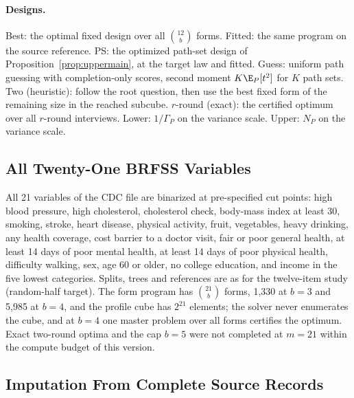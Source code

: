 \paragraph{Designs.}
Best: the optimal fixed design over all $\binom{12}b$ forms. Fitted: the same program on the source reference. PS: the optimized path-set design of Proposition~\ref{prop:uppermain}, at the target law and fitted. Guess: uniform path guessing with completion-only scores, second moment $K\E_P[t^2]$ for $K$ path sets. Two (heuristic): follow the root question, then use the best fixed form of the remaining size in the reached subcube. $r$-round (exact): the certified optimum over all $r$-round interviews. Lower: $1/\Gamma_P$ on the variance scale. Upper: $N_P$ on the variance scale.


\subsection{All Twenty-One BRFSS Variables}\label{app:scale}
All 21 variables of the CDC file are binarized at pre-specified cut points: high blood pressure, high cholesterol, cholesterol check, body-mass index at least 30, smoking, stroke, heart disease, physical activity, fruit, vegetables, heavy drinking, any health coverage, cost barrier to a doctor visit, fair or poor general health, at least 14 days of poor mental health, at least 14 days of poor physical health, difficulty walking, sex, age 60 or older, no college education, and income in the five lowest categories. Splits, trees and references are as for the twelve-item study (random-half target). The form program has $\binom{21}b$ forms, 1,330 at $b=3$ and 5,985 at $b=4$, and the profile cube has $2^{21}$ elements; the solver never enumerates the cube, and at $b=4$ one master problem over all forms certifies the optimum. Exact two-round optima and the cap $b=5$ were not completed at $m=21$ within the compute budget of this version.


\subsection{Imputation From Complete Source Records}\label{app:regimp}\label{app:shift}
